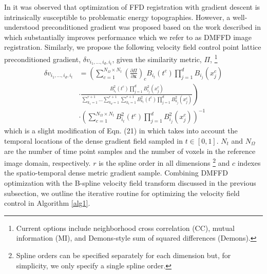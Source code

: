 \documentclass{llncs}
\begin{document}
In \cite{tustison2009} 
it was observed that optimization of FFD registration with gradient descent is 
intrinsically susceptible to problematic energy topographies.  However, a
well-understood preconditioned gradient was proposed based on the work 
described in \cite{tustison2006} which substantially 
improves performance which we refer to as DMFFD image registration.  
Similarly, we propose the following velocity field control
point lattice preconditioned gradient,
$\delta v_{i_1,\ldots,i_d,i_t}$, given the similarity metric, $\Pi$,%
\footnote
{
Current options include neighborhood cross correlation (CC), mutual information (MI), and
Demons-style sum of squared differences (Demons).
}
\begin{align}
\label{eq:dmffd}
  \delta v_{i_1,\ldots,i_d,i_t} &= \left( \sum_{c=1}^{N_{\Omega} \times N_t} \left( \frac{\partial \Pi}{\partial \mathbf{x}} \right)_c B_{i_t}(t^c)\prod_{j=1}^d B_{i_j}(x_j^c)  \right. \nonumber \\
  &\cdot \left. \frac{B_{i_t}^2(t^c) \prod_{j=1}^d B_{i_j}^2 (x_j^c)} 
  {\sum_{k_1=1}^{r+1}\ldots\sum_{k_d=1}^{r+1} \sum_{k_t=1}^{r+1} B_{k_t}^2(t^c) 
  \prod_{j=1}^d B_{k_j}^2 (x_j^c)} \right) \nonumber \\
  &\cdot\left({\sum_{c=1}^{N_{\Omega}\times N_t}B_{i_t}^2(t^c) \prod_{j=1}^d B_{i_j}^2 (x_j^c)} \right) ^{-1}
\end{align}
which is a slight modification of Eqn. (21)
in \cite{tustison2009} which takes into account the temporal locations of the 
dense gradient field sampled in $t \in [0,1]$. $N_t$ and $N_\Omega$ are the number
of time point samples and the number of voxels in the reference image domain, respectively.
$r$ is the spline order in all dimensions%
\footnote{
Spline orders can be specified separately for each dimension but, for simplicity,
we only specify a single spline order.  
}
and $c$ indexes the spatio-temporal dense metric
gradient sample.
Combining DMFFD optimization with the B-spline velocity field transform discussed in
the previous subsection, we outline the iterative routine for optimizing the 
velocity field control in Algorithm \ref{alg1}.
\end{document}
